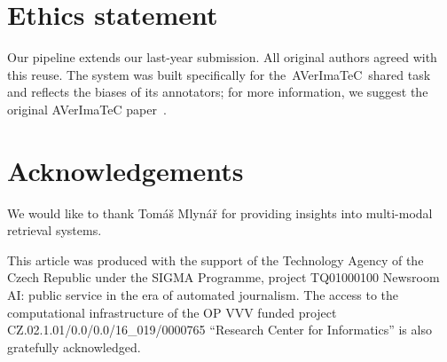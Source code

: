 \documentclass[11pt]{article}
\newcommand{\averitec}{AVerImaTeC}
\begin{document}
\section*{Ethics statement}
Our pipeline extends our last-year submission. All original authors agreed with this reuse.
The system was built specifically for the~\averitec~shared task and reflects the biases of its annotators; for more information, we suggest the original \averitec{} paper~\cite{cao2025averimatecdatasetautomaticverification}.
\section*{Acknowledgements}
We would like to thank Tomáš Mlynář for providing insights into multi-modal retrieval systems.

This article was produced with the support of the Technology Agency of the Czech Republic under the SIGMA Programme, project TQ01000100 Newsroom AI: public service in the era of automated journalism.
The access to the computational infrastructure of the OP VVV funded project CZ.02.1.01/0.0/0.0/16\_019/0000765 ``Research Center for Informatics'' is also gratefully acknowledged.






\appendix


%
%
%
\end{document}
